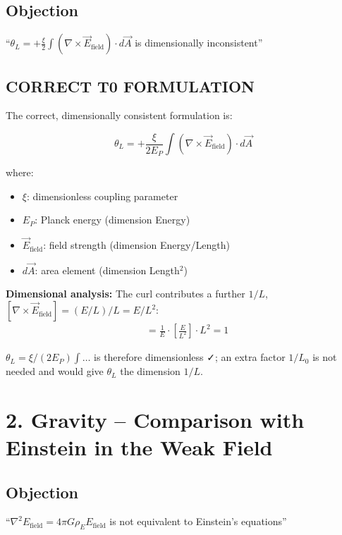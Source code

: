 	\subsection*{Objection}
	``$\theta_L = +\frac{\xi}{2} \int (\nabla \times \vec{E}_{\text{field}}) \cdot d\vec{A}$ is dimensionally inconsistent''
	
	\subsection*{\textbf{CORRECT T0 FORMULATION}}
	
	The correct, dimensionally consistent formulation is:
	
	\[
	\theta_L = +\frac{\xi}{2E_P} \int (\nabla \times \vec{E}_{\text{field}}) \cdot d\vec{A}
	\]
	
	where:
	\begin{itemize}
		\item $\xi$: dimensionless coupling parameter
		\item $E_P$: Planck energy (dimension Energy)
		\item $\vec{E}_{\text{field}}$: field strength (dimension Energy/Length)
		\item $d\vec{A}$: area element (dimension Length$^2$)
	\end{itemize}
	
	\textbf{Dimensional analysis:} The curl contributes a further $1/L$, $[\nabla \times \vec{E}_{\text{field}}] = (E/L)/L = E/L^2$:
	\begin{align*}
		[\theta_L] &= \frac{1}{E} \cdot \left[\frac{E}{L^2}\right] \cdot L^2 = 1
	\end{align*}
	
	$\theta_L = \xi/(2E_P)\int\ldots$ is therefore dimensionless ✓; an extra factor $1/L_0$ is not needed and would give $\theta_L$ the dimension $1/L$.
	
	\section*{2. Gravity – Comparison with Einstein in the Weak Field}
	
	\subsection*{Objection}
	``$\nabla^2 E_{\text{field}} = 4\pi G \rho_E E_{\text{field}}$ is not equivalent to Einstein's equations''
	
